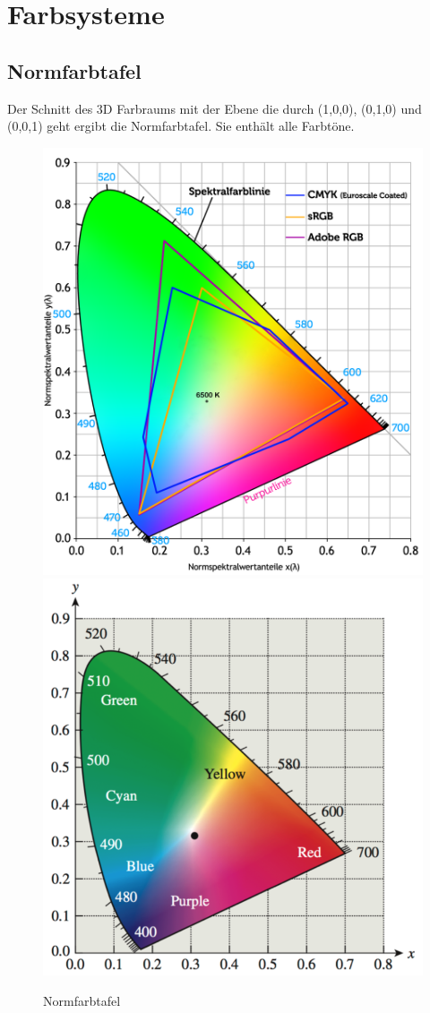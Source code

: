 \clearpage
\section{Farbsysteme}
\subsection{Normfarbtafel}
Der Schnitt des 3D Farbraums mit der Ebene die durch (1,0,0), (0,1,0) und (0,0,1) geht ergibt die Normfarbtafel. Sie enthält alle Farbtöne.
\begin{figure}[!ht]
\centering
\includegraphics[width=0.4\linewidth]{fig/normfarbtafel}
\includegraphics[width=0.4\linewidth]{fig/normfarbtafel2}
\caption{Normfarbtafel}
\label{fig:normfarbtafel}
\end{figure}

